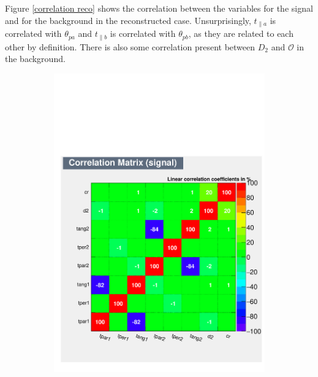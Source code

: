 \documentclass[10pt,a4paper]{book}
\begin{document}
Figure \ref{correlation reco} shows the correlation between the variables for the signal and for the background in the reconstructed case. Unsurprisingly, $t_{\parallel a}$ is correlated with $\theta_{pa}$ and $t_{\parallel b}$ is correlated with $\theta_{pb}$, as they are related to each other by definition. There is also some correlation present between $D_2$ and $\mathcal{O}$ in the background. 

\begin{figure}[h]
\begin{subfigure}{1.0\textwidth}
\centering
\includegraphics[scale=0.55]{reco/CorrelationMatrixS.pdf}
\caption{}
\end{subfigure}
\begin{subfigure}{1.0\textwidth}
\centering

\end{subfigure}
\end{figure}
\end{document}
